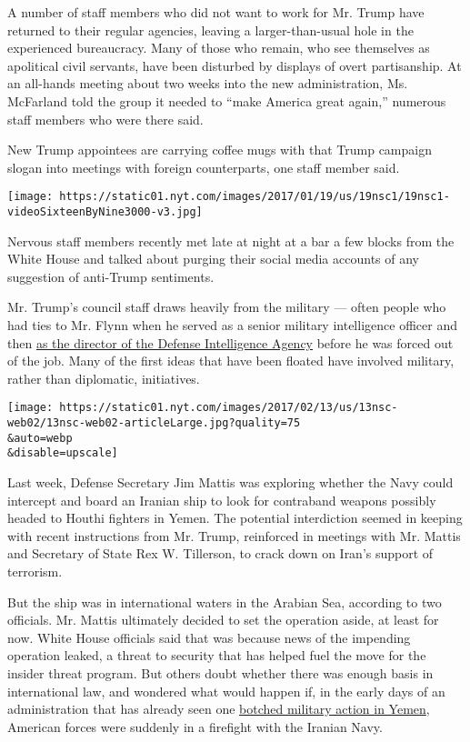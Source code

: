 A number of staff members who did not want to work for Mr. Trump have
returned to their regular agencies, leaving a larger-than-usual hole in
the experienced bureaucracy. Many of those who remain, who see
themselves as apolitical civil servants, have been disturbed by displays
of overt partisanship. At an all-hands meeting about two weeks into the
new administration, Ms. McFarland told the group it needed to ``make
America great again,'' numerous staff members who were there said.

New Trump appointees are carrying coffee mugs with that Trump campaign
slogan into meetings with foreign counterparts, one staff member said.

\texttt{[image: https://static01.nyt.com/images/2017/01/19/us/19nsc1/19nsc1-videoSixteenByNine3000-v3.jpg]}

Nervous staff members recently met late at night at a bar a few blocks
from the White House and talked about purging their social media
accounts of any suggestion of anti-Trump sentiments.

Mr. Trump's council staff draws heavily from the military --- often
people who had ties to Mr. Flynn when he served as a senior military
intelligence officer and then
\href{https://www.nytimes.com/2016/12/03/us/politics/in-national-security-adviser-michael-flynn-experience-meets-a-prickly-past.html}{as
the director of the Defense Intelligence Agency} before he was forced
out of the job. Many of the first ideas that have been floated have
involved military, rather than diplomatic, initiatives.

\texttt{[image: https://static01.nyt.com/images/2017/02/13/us/13nsc-web02/13nsc-web02-articleLarge.jpg?quality=75\\\&auto=webp\\\&disable=upscale]}

Last week, Defense Secretary Jim Mattis was exploring whether the Navy
could intercept and board an Iranian ship to look for contraband weapons
possibly headed to Houthi fighters in Yemen. The potential interdiction
seemed in keeping with recent instructions from Mr. Trump, reinforced in
meetings with Mr. Mattis and Secretary of State Rex W. Tillerson, to
crack down on Iran's support of terrorism.

But the ship was in international waters in the Arabian Sea, according
to two officials. Mr. Mattis ultimately decided to set the operation
aside, at least for now. White House officials said that was because
news of the impending operation leaked, a threat to security that has
helped fuel the move for the insider threat program. But others doubt
whether there was enough basis in international law, and wondered what
would happen if, in the early days of an administration that has already
seen one
\href{https://www.nytimes.com/2017/02/01/world/middleeast/donald-trump-yemen-commando-raid-questions.html}{botched
military action in Yemen}, American forces were suddenly in a firefight
with the Iranian Navy.

